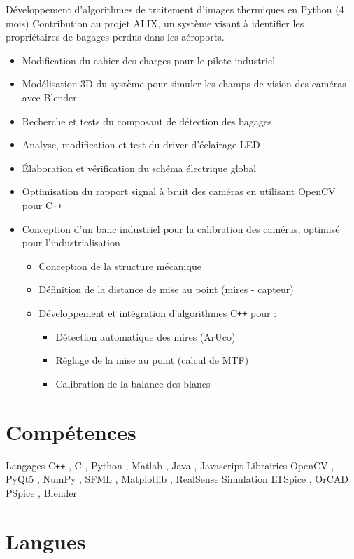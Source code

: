 \documentclass[11pt,a4paper]{moderncv}
\begin{document}
    {
    Développement d'algorithmes de traitement d'images thermiques en Python (4 mois) \newline
    Contribution au projet ALIX, un système visant à identifier les propriétaires de bagages perdus dans les aéroports. 
    \begin{itemize}
        \setlength{\itemindent}{1cm}
        \item Modification du cahier des charges pour le pilote industriel
        \item Modélisation 3D du système pour simuler les champs de vision des caméras avec Blender
        \item Recherche et tests du composant de détection des bagages
        \item Analyse, modification et test du driver d'éclairage LED
        \item Élaboration et vérification du schéma électrique global
        \item Optimisation du rapport signal à bruit des caméras en utilisant OpenCV pour C\texttt{++}
        \item Conception d'un banc industriel pour la calibration des caméras, optimisé pour l'industrialisation
        \begin{itemize}
            \setlength{\itemindent}{1.5cm}
            \item Conception de la structure mécanique 
            \item Définition de la distance de mise au point (mires - capteur)
            \item Développement et intégration d'algorithmes C\texttt{++} pour :
            \begin{itemize}
                \setlength{\itemindent}{2.5cm}
                \item Détection automatique des mires (ArUco)
                \item Réglage de la mise au point (calcul de MTF)
                \item Calibration de la balance des blancs 
            \end{itemize}
        \end{itemize}
    \end{itemize}
    }

    
\section{Compétences}

\cvitem
    {Langages}
    {C\texttt{++} , C  , Python  , Matlab  , Java  , Javascript  }
\cvitem
    {Librairies}
    {OpenCV  , PyQt5  , NumPy  , SFML  , Matplotlib , RealSense }
\cvitem
    {Simulation}
    {LTSpice  , OrCAD PSpice , Blender }

\section{Langues}
\end{document}
